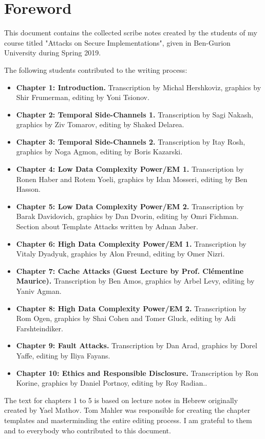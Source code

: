 \chapter*{Foreword} \label{chap:foreword}

This document contains the collected scribe notes created by the students of
my course titled "Attacks on Secure Implementations", given in
Ben-Gurion University during Spring 2019. 

The following students contributed to the writing process:
\begin{itemize}
    \item \textbf{Chapter 1: Introduction.}	Transcription by Michal Hershkoviz,
    graphics by	Shir Frumerman, editing by Yoni Tsionov.
    \item \textbf{Chapter 2: Temporal Side-Channels 1.}	Transcription by Sagi Nakash,
    graphics by	Ziv Tomarov, editing by Shaked Delarea.
    \item \textbf{Chapter 3: Temporal Side-Channels 2.}	Transcription by Itay Rosh,
    graphics by	Noga Agmon, editing by Boris Kazarski.
    \item \textbf{Chapter 4: Low Data Complexity Power/EM 1.}	Transcription by Ronen Haber
    and Rotem Yoeli, graphics by Idan Mosseri, editing by Ben Hasson.
    \item \textbf{Chapter 5: Low Data Complexity Power/EM 2.}	Transcription by Barak Davidovich,
    graphics by	Dan Dvorin, editing by Omri Fichman. Section about Template
    Attacks written by Adnan Jaber.
    \item \textbf{Chapter 6: High Data Complexity Power/EM 1.}	Transcription by Vitaly
    Dyadyuk, graphics by	Alon Freund, editing by Omer Nizri.
    \item \textbf{Chapter 7: Cache Attacks (Guest Lecture by Prof. Clémentine Maurice).}	Transcription by Ben Amos,
    graphics by	Arbel Levy, editing by Yaniv Agman.
    			
    \item \textbf{Chapter 8: High Data Complexity Power/EM 2.}	Transcription by Rom Ogen,
    graphics by	Shai Cohen and Tomer Gluck, editing by Adi Farshteindiker.
    \item \textbf{Chapter 9: Fault Attacks.}	Transcription by Dan Arad,
    graphics by	Dorel Yaffe, editing by Iliya Fayans.
    \item \textbf{Chapter 10: Ethics and Responsible Disclosure.}	Transcription by Ron Korine,
    graphics by	Daniel Portnoy, editing by Roy Radian..
\end{itemize}

The text for chapters 1 to 5 is based on lecture notes in Hebrew originally
created by Yael Mathov. Tom Mahler was responsible for creating the chapter
templates and masterminding the entire editing process. I am grateful to them
and to everybody who contributed to this document.